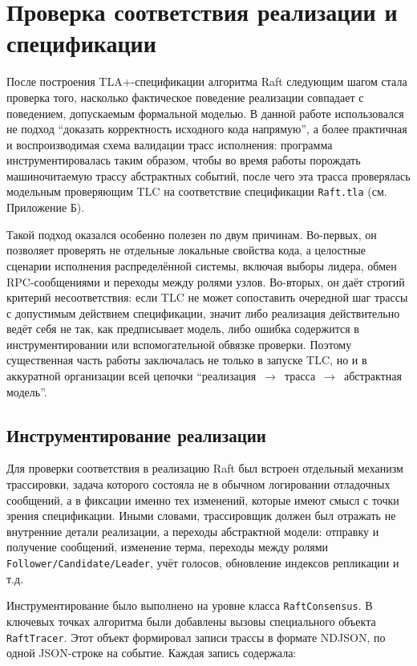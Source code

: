 \section{Проверка соответствия реализации и спецификации}

После построения TLA+-спецификации алгоритма Raft следующим шагом стала
проверка того, насколько фактическое поведение реализации совпадает с
поведением, допускаемым формальной моделью. В данной работе использовался не
подход ``доказать корректность исходного кода напрямую'', а более практичная и
воспроизводимая схема валидации трасс исполнения: программа
инструментировалась таким образом, чтобы во время работы порождать
машиночитаемую трассу абстрактных событий, после чего эта трасса проверялась
модельным проверяющим TLC на соответствие спецификации \texttt{Raft.tla} (см.
Приложение Б).

Такой подход оказался особенно полезен по двум причинам. Во-первых, он
позволяет проверять не отдельные локальные свойства кода, а целостные сценарии
исполнения распределённой системы, включая выборы лидера, обмен RPC-сообщениями
и переходы между ролями узлов. Во-вторых, он даёт строгий критерий
несоответствия: если TLC не может сопоставить очередной шаг трассы с допустимым
действием спецификации, значит либо реализация действительно ведёт себя не так,
как предписывает модель, либо ошибка содержится в инструментировании или
вспомогательной обвязке проверки. Поэтому существенная часть работы заключалась
не только в запуске TLC, но и в аккуратной организации всей цепочки
``реализация~$\rightarrow$~трасса~$\rightarrow$~абстрактная модель''.

\subsection{Инструментирование реализации}

Для проверки соответствия в реализацию Raft был встроен отдельный механизм
трассировки, задача которого состояла не в обычном логировании отладочных
сообщений, а в фиксации именно тех изменений, которые имеют смысл с точки
зрения спецификации. Иными словами, трассировщик должен был отражать не
внутренние детали реализации, а переходы абстрактной модели: отправку и
получение сообщений, изменение терма, переходы между ролями
\texttt{Follower/Candidate/Leader}, учёт голосов, обновление индексов
репликации и т.д.

Инструментирование было выполнено на уровне класса
\texttt{RaftConsensus}. В ключевых точках алгоритма были добавлены вызовы
специального объекта \texttt{RaftTracer}. Этот объект формировал записи трассы
в формате NDJSON, по одной JSON-строке на событие. Каждая запись содержала:

